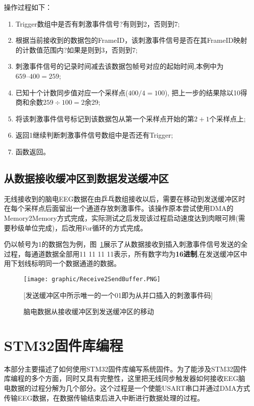 	操作过程如下：
\begin{enumerate}
\item 	Trigger数组中是否有刺激事件信号?有则到2，否则到7;
\item 	根据当前接收到的数据包的FrameID，该刺激事件信号是否在其FrameID映射的计数值范围内?如果是则到3，否则到7;
\item 	刺激事件信号的记录时间减去该数据包帧号对应的起始时间,本例中为$659 – 400 = 259$;
\item 	已知十个计数同步值对应一个采样点($400/4 =100$), 把上一步的结果除以10得商和余数$259 \div 100 = 2$余$29$;
\item	将该刺激事件信号标记到该数据包从第一个采样点开始的第$2+1$个采样点上; 
\item	返回1继续判断刺激事件信号数组中是否还有Trigger;
\item	函数返回。
\end{enumerate}

\subsection{从数据接收缓冲区到数据发送缓冲区}
无线接收到的脑电EEG数据在由乒乓数组接收以后，需要在移动到发送缓冲区时在每个采样点后面留出一个通道存放刺激事件。该操作原本尝试使用DMA的Memory2Memory方式完成，实际测试之后发现该过程启动速度达到肉眼可辨(需要秒级单位完成)，后改用For循环的方式完成。

仍以帧号为1的数据包为例，图~\ref{Receive2Send}展示了从数据接收到插入刺激事件信号发送的全过程，每通道数据全部用11 11 11 11表示，所有数字均为\textbf{16进制},在发送缓冲区中用下划线标明同一个数据通道的数据。
\begin{figure}[!hbp]
\begin{center}
\texttt{[image: graphic/Receive2SendBuffer.PNG]}
\caption{脑电数据从接收缓冲区到发送缓冲区的移动 \label{Receive2Send}}
[发送缓冲区中所示唯一的一个01即为从并口插入的刺激事件码]
\end{center}
\end{figure}


\section{STM32固件库编程\label{sec:STM32Firmware}}
	本部分主要描述了如何使用STM32固件库编写系统固件。为了能涉及STM32固件库编程的多个方面，同时又具有完整性，这里把无线同步触发器如何接收EEG脑电数据的过程分解为几个部分。这个过程是一个使能USART串口并通过DMA方式传输EEG数据，在数据传输结束后进入中断进行数据处理的过程。

